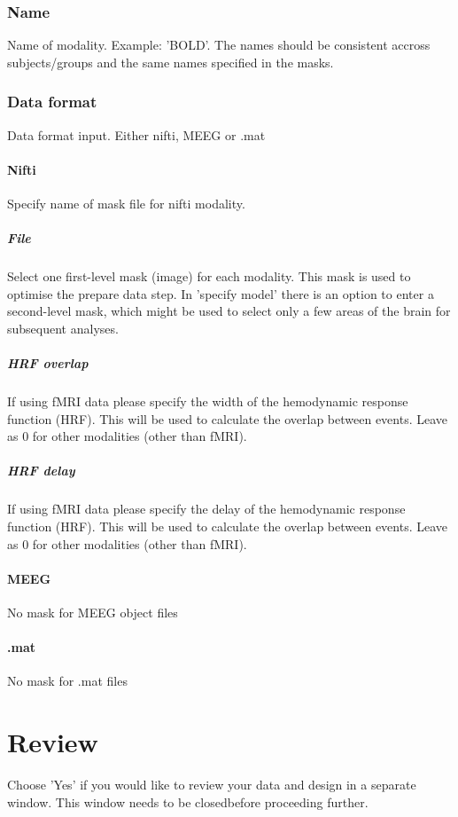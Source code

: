 \subsubsection{Name}
Name of modality. Example: 'BOLD'. The names should be consistent accross subjects/groups and the same names specified in the masks.


\subsubsection{Data format}
Data format input. Either nifti, MEEG or .mat


\paragraph{Nifti}
Specify name of mask file for nifti modality.


\subparagraph{File}
Select one first-level mask (image) for each modality. This mask is used to optimise the prepare data step. In 'specify model' there is an option to enter a second-level mask, which might be used to select only a few areas of the brain for subsequent analyses.


\subparagraph{HRF overlap}
If using fMRI data please specify the width of the hemodynamic response function (HRF). This will be used to calculate the overlap between events. Leave as 0 for other modalities (other than fMRI).


\subparagraph{HRF delay}
If using fMRI data please specify the delay of the hemodynamic response function (HRF). This will be used to calculate the overlap between events. Leave as 0 for other modalities (other than fMRI).


\paragraph{MEEG}
No mask for MEEG object files


\paragraph{.mat}
No mask for .mat files


\section{Review}
Choose 'Yes' if you would like to review your data and design in a separate window. This window needs to be closedbefore proceeding further.

